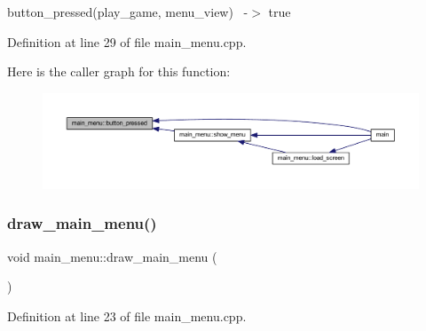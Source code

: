 button\+\_\+pressed(play\+\_\+game, menu\+\_\+view)~\newline
-\/$>$ true 

Definition at line 29 of file main\+\_\+menu.\+cpp.

Here is the caller graph for this function\+:
\nopagebreak
\begin{figure}[H]
\begin{center}
\leavevmode
\includegraphics[width=350pt]{classmain__menu_a9314da13b6b8a7cd40dee3d45f029835_icgraph}
\end{center}
\end{figure}
\mbox{\label{classmain__menu_a2f5aeef38a566a25311f77bc24b8c8b5}} 
\subsubsection{\texorpdfstring{draw\+\_\+main\+\_\+menu()}{draw\_main\_menu()}}
{\footnotesize\ttfamily void main\+\_\+menu\+::draw\+\_\+main\+\_\+menu (\begin{DoxyParamCaption}{ }\end{DoxyParamCaption})\hspace{0.3cm}{\ttfamily [private]}}



Definition at line 23 of file main\+\_\+menu.\+cpp.

